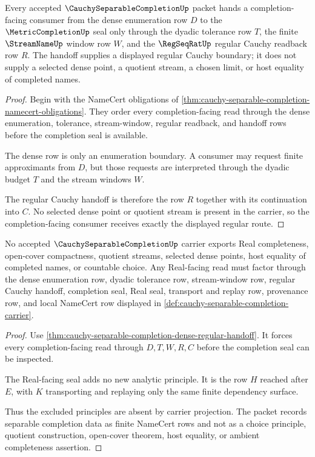\begin{theorem}
\label{thm:cauchy-separable-completion-dense-regular-handoff}
Every accepted $\CauchySeparableCompletionUp$ packet hands a completion-facing consumer from the dense enumeration row $D$ to the $\MetricCompletionUp$ seal only through the dyadic tolerance row $T$, the finite $\StreamNameUp$ window row $W$, and the $\RegSeqRatUp$ regular Cauchy readback row $R$. The handoff supplies a displayed regular Cauchy boundary; it does not supply a selected dense point, a quotient stream, a chosen limit, or host equality of completed names.
\end{theorem}
\begin{proof}
Begin with the NameCert obligations of \autoref{thm:cauchy-separable-completion-namecert-obligations}. They order every completion-facing read through the dense enumeration, tolerance, stream-window, regular readback, and handoff rows before the completion seal is available.

The dense row is only an enumeration boundary. A consumer may request finite approximants from $D$, but those requests are interpreted through the dyadic budget $T$ and the stream windows $W$.

The regular Cauchy handoff is therefore the row $R$ together with its continuation into $C$. No selected dense point or quotient stream is present in the carrier, so the completion-facing consumer receives exactly the displayed regular route.
\end{proof}

\begin{theorem}
\label{thm:cauchy-separable-completion-no-choice-boundary}
No accepted $\CauchySeparableCompletionUp$ carrier exports Real completeness, open-cover compactness, quotient streams, selected dense points, host equality of completed names, or countable choice. Any Real-facing read must factor through the dense enumeration row, dyadic tolerance row, stream-window row, regular Cauchy handoff, completion seal, Real seal, transport and replay row, provenance row, and local NameCert row displayed in \autoref{def:cauchy-separable-completion-carrier}.
\end{theorem}
\begin{proof}
Use \autoref{thm:cauchy-separable-completion-dense-regular-handoff}. It forces every completion-facing read through $D,T,W,R,C$ before the completion seal can be inspected.

The Real-facing seal adds no new analytic principle. It is the row $H$ reached after $E$, with $K$ transporting and replaying only the same finite dependency surface.

Thus the excluded principles are absent by carrier projection. The packet records separable completion data as finite NameCert rows and not as a choice principle, quotient construction, open-cover theorem, host equality, or ambient completeness assertion.
\end{proof}

